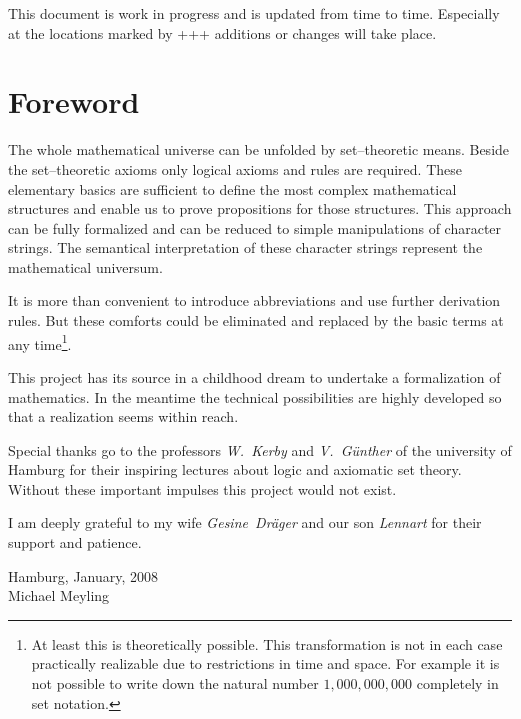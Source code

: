 \documentclass[a4paper,german,10pt,twoside]{book}
\theoremstyle{definition}
\theoremstyle{remark}
\begin{document}
\par
This document is work in progress and is updated from time to time. Especially at the locations marked by {\glqq+++\grqq} additions or changes will take place.


\chapter*{Foreword} \label{chapter1} \hypertarget{chapter1}{}

The whole mathematical universe can be unfolded by set--theoretic means. Beside the set--theoretic axioms only logical axioms and rules are required. These elementary basics are sufficient to define the most complex mathematical structures and enable us to prove propositions for those structures. This approach can be fully formalized and can be reduced to simple manipulations of character strings. The semantical interpretation of these character strings represent the mathematical universum.

\par
It is more than convenient to introduce abbreviations and use further derivation rules. But these comforts could be eliminated and replaced by the basic terms at any time\footnote{At least this is theoretically possible. This transformation is not in each case practically realizable due to restrictions in time and space. For example it is not possible to write down the
natural number $1,000,000,000$ completely in set notation.}.

\par
This project has its source in a childhood dream to undertake a formalization of mathematics. In the meantime the technical possibilities are highly developed so that a realization seems within reach.

\par
Special thanks go to the professors \emph{W.~Kerby} and \emph{V.~G{\"u}nther} of the university of Hamburg for their inspiring lectures about logic and axiomatic set theory. Without these important impulses this project would not exist.

\par
I am deeply grateful to my wife \emph{Gesine~Dr{\"a}ger} and our son \emph{Lennart} for their support and patience.          

\par
\vspace*{1cm} Hamburg, January, 2008 \\
\hspace*{\fill} Michael Meyling
\end{document}
